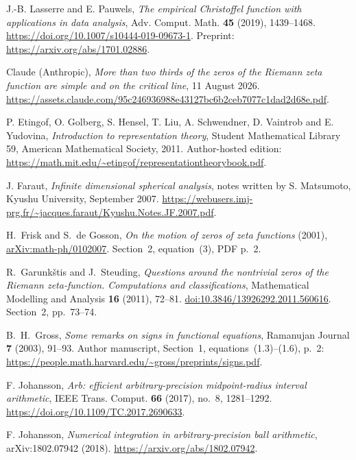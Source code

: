  J.-B. Lasserre and E. Pauwels,
\emph{The empirical Christoffel function with applications in data analysis},
Adv. Comput. Math. \textbf{45} (2019), 1439--1468.
\url{https://doi.org/10.1007/s10444-019-09673-1}.
Preprint: \url{https://arxiv.org/abs/1701.02886}.

 Claude (Anthropic), \emph{More than two thirds of the zeros of the Riemann zeta function are simple and on the critical line},
11 August 2026.
\url{https://assets.claude.com/95c246936988e43127bc6b2ceb7077c1dad2d68e.pdf}.

 P. Etingof, O. Golberg, S. Hensel, T. Liu, A. Schwendner,
D. Vaintrob and E. Yudovina,
\emph{Introduction to representation theory},
Student Mathematical Library 59, American Mathematical Society, 2011.
Author-hosted edition:
\url{https://math.mit.edu/~etingof/representationtheorybook.pdf}.

 J. Faraut, \emph{Infinite dimensional spherical analysis},
notes written by S. Matsumoto, Kyushu University, September 2007.
\url{https://webusers.imj-prg.fr/~jacques.faraut/Kyushu.Notes.JF.2007.pdf}.

 H.~Frisk and S.~de Gosson,
\emph{On the motion of zeros of zeta functions} (2001),
\href{https://arxiv.org/abs/math-ph/0102007}{arXiv:math-ph/0102007}.
Section~2, equation~(3), PDF p.~2.

 R.~Garunk\v stis and J.~Steuding,
\emph{Questions around the nontrivial zeros of the Riemann
zeta-function. Computations and classifications},
Mathematical Modelling and Analysis \textbf{16} (2011), 72--81.
\href{https://doi.org/10.3846/13926292.2011.560616}{doi:10.3846/13926292.2011.560616}.
Section~2, pp.~73--74.

 B.~H.~Gross, \emph{Some remarks on signs in functional equations}, Ramanujan Journal \textbf{7} (2003), 91--93. Author manuscript, Section~1, equations~(1.3)--(1.6), p.~2: \url{https://people.math.harvard.edu/~gross/preprints/signs.pdf}.

 F. Johansson, \emph{Arb: efficient arbitrary-precision midpoint-radius interval arithmetic},
IEEE Trans. Comput. \textbf{66} (2017), no.~8, 1281--1292.
\url{https://doi.org/10.1109/TC.2017.2690633}.

 F. Johansson, \emph{Numerical integration in arbitrary-precision ball arithmetic},
arXiv:1802.07942 (2018).
\url{https://arxiv.org/abs/1802.07942}.

